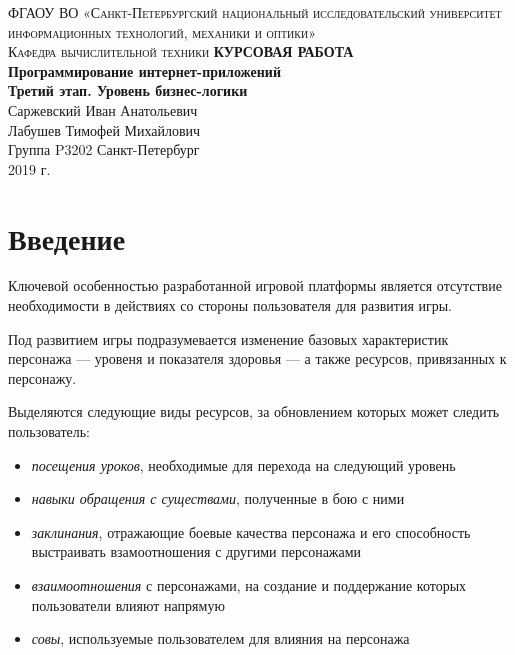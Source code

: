 \documentclass[12pt, a4paper]{article}
\begin{document}
\begin{titlepage}
\begin{center}

\textsc{ФГАОУ ВО «Санкт-Петербургский национальный исследовательский университет информационных технологий, механики и оптики»\\[4mm]
Кафедра вычислительной техники}
\vfill
\textbf{КУРСОВАЯ РАБОТА\\[4mm]
Программирование интернет-приложений\\[4mm]
Третий этап. Уровень бизнес-логики}\\[16mm]
Саржевский Иван Анатольевич
\\[2mm]Лабушев Тимофей Михайлович
\\[2mm]Группа P3202
\vfill
Санкт-Петербург\\[2mm]
2019 г.
\end{center}
\end{titlepage}


\section*{Введение}

Ключевой особенностью разработанной игровой платформы является отсутствие
необходимости в действиях со стороны пользователя для развития игры.

Под развитием игры подразумевается изменение базовых характеристик персонажа —
уровеня и показателя здоровья — а также ресурсов, привязанных к персонажу.

Выделяются следующие виды ресурсов, за обновлением которых может следить пользователь:

\begin{itemize}[noitemsep, topsep=0pt]
\item \textit{посещения уроков}, необходимые для перехода на следующий уровень
\item \textit{навыки обращения с существами}, полученные в бою с ними
\item \textit{заклинания}, отражающие боевые качества персонажа и его способность 
  выстраивать взамоотношения с другими персонажами
\item \textit{взаимоотношения} с персонажами, на создание и поддержание которых
  пользователи влияют напрямую
\item \textit{совы}, используемые пользователем для влияния на персонажа
\end{itemize}
\end{document}
